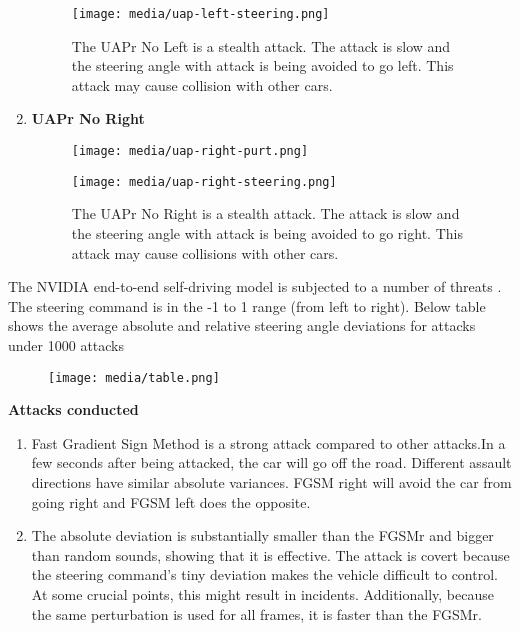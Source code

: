 \documentclass[ 12pt,a4paper,twocolumn,fleqn]{article}
\begin{document}
\begin{enumerate}
    \begin{figure}[H]
    \texttt{[image: media/uap-left-steering.png]}
    \centering
    \caption{The UAPr No Left is a stealth attack. The attack is slow and the steering angle with attack  is being avoided to go left. This attack may cause collision with other cars.}
    \end{figure}
    
    \item \textbf{UAPr No Right}
    \begin{figure}[H]
    \texttt{[image: media/uap-right-purt.png]}
    \centering
    \end{figure}
    

    \begin{figure}[H]
    \texttt{[image: media/uap-right-steering.png]}
    \centering
    \caption{The UAPr No Right is a stealth attack. The attack is slow and the steering angle with attack  is being avoided to go right. This attack may cause collisions with other cars.}
    \end{figure}

\end{enumerate}

The NVIDIA end-to-end self-driving model is subjected to a number of threats . The steering command is in the -1 to 1 range (from left to right). Below table shows the average absolute and relative steering angle deviations for attacks under 1000 attacks

\begin{figure}[H]
\texttt{[image: media/table.png]}
\centering
\end{figure}

\textbf{Attacks conducted}\\
\begin{enumerate}
    \item Fast Gradient Sign Method is a strong attack compared to other attacks.In a few seconds after being attacked, the car will go off the road. Different assault directions have similar absolute variances. FGSM right will avoid the car from going right and FGSM left does the opposite.
    \item The absolute deviation is substantially smaller than the FGSMr and bigger than random sounds, showing that it is effective. The attack is covert because the steering command's tiny deviation makes the vehicle difficult to control. At some crucial points, this might result in incidents. Additionally, because the same perturbation is used for all frames, it is faster than the FGSMr.
\end{enumerate}
\end{document}
